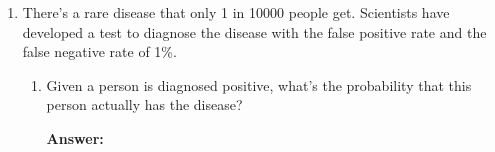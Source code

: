 \documentclass{article}
\newenvironment{QandA}{\begin{enumerate}[label=\arabic*.]}{\end{enumerate}}
\newenvironment{InnerQandA}{\begin{enumerate}[label=\roman*.]}{\end{enumerate}}
\newenvironment{answer}{\par\normalfont \textbf{Answer:}}{}
\newcommand{\g}{\vert}
\begin{document}
\begin{QandA}
\begin{InnerQandA}
        \item Suppose you now get two chips coming from the same company, but you don't know which one. When you test the first chip, it appears to be functioning. What is the probability that the second electronic chip is also good?
        \begin{answer}
            Let us denote the two chips with random variables $c_1$ and $c_2$. Then, we are interested in the probability:
            \begin{align*}
                &p(c_2=1 \g c_1=1) \\
                = &\frac{p(c_2=1, c_1=1)}{p(c_1 = 1)} \\
                = &\frac{p(c_2=1, c_1=1 \g m=A)p(m=A) + p(c_2=1, c_1=1 \g m=B)p(m=B)}{p(c_1 = 1 \g m=A)p(m=A) + p(c_1 = 1 \g m=B)p(m=B)} \\
                = &\frac{p(c_2=1 \g m=A)p(c_1=1 \g m=A)p(m=A) + p(c_2=1 \g m=B)p(c_1=1 \g m=B)p(m=B)}{p(c_1 = 1 \g m=A)p(m=A) + p(c_1 = 1 \g m=B)p(m=B)} &\text{(cond. indep.)}\\
                = &\frac{0.7 \cdot 0.7 \cdot 0.5 + 0.3 \cdot 0.3 \cdot 0.5}{0.7 \cdot 0.5 + 0.3 \cdot 0.5} \\
                = &0.58
            \end{align*}
        \end{answer}
    \end{InnerQandA}
    
    \item There's a rare disease that only 1 in 10000 people get. Scientists have developed a test to diagnose the disease with the false positive rate and the false negative rate of 1\%. 
    \begin{InnerQandA}
        \item Given a person is diagnosed positive, what’s the probability that this person actually has the disease?
        \begin{answer}


\end{answer}
\end{InnerQandA}
\end{QandA}
\end{document}

